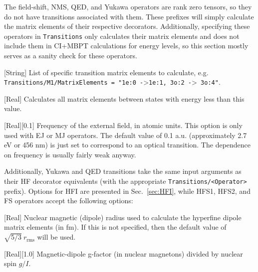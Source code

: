 \documentclass{report}
\begin{document}
The field-shift, NMS, QED, and Yukawa operators are rank zero tensors, so they do not have transitions
associated with them. These prefixes will simply calculate the matrix elements of their respective
decorators. Additionally, specifying these operators in \texttt{Transitions} only calculates their
matrix elements and does not include them in CI+MBPT calculations for energy levels, so this
section mostly serves as a sanity check for these operators.

[String]{%
List of specific transition matrix elements to calculate, e.g.
\texttt{Transitions/M1/MatrixElements = "1e:0 -}\textgreater \texttt{1e:1, 3o:2 -}\textgreater\texttt{ 3o:4"}.%
}

[Real]{%
Calculates all matrix elements between states with energy less than this value.%
}

[Real][0.1]{%
Frequency of the external field, in atomic units. This option is only used with EJ or MJ operators. The default value of 0.1 a.u. (approximately 2.7 eV or 456 nm) is just set to correspond to an optical transition. The dependence on frequency is usually fairly weak anyway.%
}




Additionally, Yukawa and QED transitions take the same input arguments as their HF decorator equivalents (with the appropriate \hbox{\texttt{Transitions/\textless{Operator}\textgreater}} prefix). Options for HFI are presented in Sec.~\ref{sec:HFI}, while HFS1, HFS2, and FS operators accept the following options:

[Real]{%
Nuclear magnetic (dipole) radius used to calculate the hyperfine dipole matrix elements (in fm). If this is not
specified, then the default value of $\sqrt{5/3} ~ r_{\textrm{rms}}$ will be used.%
}

[Real][1.0]{%
Magnetic-dipole g-factor (in nuclear magnetons) divided by nuclear spin $g/I$.%
}
\end{document}
